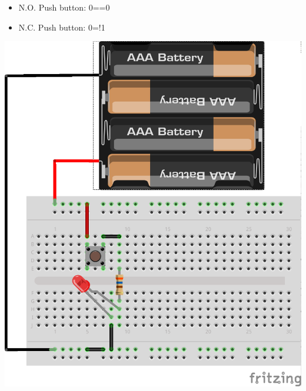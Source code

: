 \vfill
\begin{itemize}
	\item N.O. Push button: 0==0
	\item N.C. Push button: 0=!1
\end{itemize}
\begin{center}
	\includegraphics[height=.8\textheight]{./IMG/LED_bb-button.png}
\end{center}

\vfill\columnbreak

